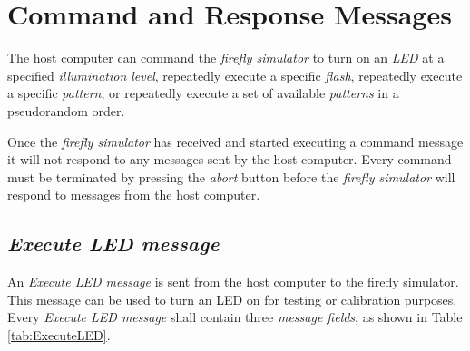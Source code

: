 \documentclass[letterpaper,11pt]{article}
\begin{document}

\section{Command and Response Messages}

The host computer can command the \textit{firefly simulator} to turn on an
\textit{LED} at a specified \textit{illumination level}, repeatedly execute a
specific \textit{flash}, repeatedly execute a specific \textit{pattern}, or
repeatedly execute a set of available \textit{patterns} in a pseudorandom order.

Once the \textit{firefly simulator} has received and started executing a
command message it will not respond to any messages sent by the host computer.
Every command must be terminated by pressing the \textit{abort} button before
the \textit{firefly simulator} will respond to messages from the host computer.

\subsection{\textit{Execute LED message}}

An \textit{Execute LED message} is sent from the host computer to the
firefly simulator. This message can be used to turn an LED on for
testing or calibration purposes. Every \textit{Execute LED message} shall
contain three \textit{message fields}, as shown in Table \ref{tab:ExecuteLED}.
\end{document}
